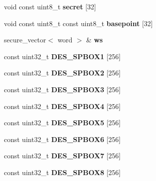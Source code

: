 \begin{DoxyCompactItemize}
void const uint8\+\_\+t {\bfseries secret} \mbox{[}32\mbox{]}
\item 
\mbox{\label{namespace_botan_aaeeebbc3ab0606e584c4c80e830e2531}} 
void const uint8\+\_\+t const uint8\+\_\+t {\bfseries basepoint} \mbox{[}32\mbox{]}
\item 
\mbox{\label{namespace_botan_a9402ed99fea4c227e79749b10505dc4e}} 
secure\+\_\+vector$<$ word $>$ \& {\bfseries ws}
\item 
\mbox{\label{namespace_botan_a88d4123e704cbe13fb45c4c536d87986}} 
const uint32\+\_\+t {\bfseries D\+E\+S\+\_\+\+S\+P\+B\+O\+X1} \mbox{[}256\mbox{]}
\item 
\mbox{\label{namespace_botan_a64255cc56044a45bfd6c679c8eb97b47}} 
const uint32\+\_\+t {\bfseries D\+E\+S\+\_\+\+S\+P\+B\+O\+X2} \mbox{[}256\mbox{]}
\item 
\mbox{\label{namespace_botan_a166a7e1939d109114302711997f3a5c3}} 
const uint32\+\_\+t {\bfseries D\+E\+S\+\_\+\+S\+P\+B\+O\+X3} \mbox{[}256\mbox{]}
\item 
\mbox{\label{namespace_botan_ac6872f77a3900db1f030a596d59a8b8c}} 
const uint32\+\_\+t {\bfseries D\+E\+S\+\_\+\+S\+P\+B\+O\+X4} \mbox{[}256\mbox{]}
\item 
\mbox{\label{namespace_botan_a81f8175ad9e1bee91456503783675752}} 
const uint32\+\_\+t {\bfseries D\+E\+S\+\_\+\+S\+P\+B\+O\+X5} \mbox{[}256\mbox{]}
\item 
\mbox{\label{namespace_botan_ab68ba74fd250222201bedc6c687c45b1}} 
const uint32\+\_\+t {\bfseries D\+E\+S\+\_\+\+S\+P\+B\+O\+X6} \mbox{[}256\mbox{]}
\item 
\mbox{\label{namespace_botan_a4c063556e1ae00baa44fdb9769801551}} 
const uint32\+\_\+t {\bfseries D\+E\+S\+\_\+\+S\+P\+B\+O\+X7} \mbox{[}256\mbox{]}
\item 
\mbox{\label{namespace_botan_af518f29cfbbaaf2997ed302ffccbb406}} 
const uint32\+\_\+t {\bfseries D\+E\+S\+\_\+\+S\+P\+B\+O\+X8} \mbox{[}256\mbox{]}

\end{DoxyCompactItemize}
